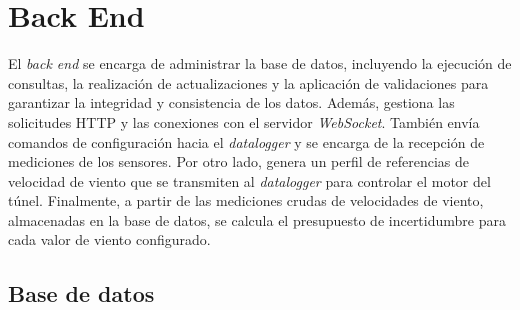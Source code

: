 \section{Back End}\label{sec:back_end}

El \textit{back end} se encarga de administrar la base de datos, incluyendo la ejecución de consultas, la realización de actualizaciones y la aplicación de validaciones para garantizar la integridad y consistencia de los datos. Además, gestiona las solicitudes HTTP y las conexiones con el servidor \textit{WebSocket}. También envía comandos de configuración hacia el \textit{datalogger} y se encarga de la  recepción de mediciones de los sensores. Por otro lado, genera un perfil de referencias de velocidad de viento que se transmiten al \textit{datalogger} para controlar el motor del túnel. Finalmente, a partir de las mediciones crudas de velocidades de viento, almacenadas en la base de datos, se calcula el presupuesto de incertidumbre para cada valor de viento configurado.

\subsection{Base de datos}

